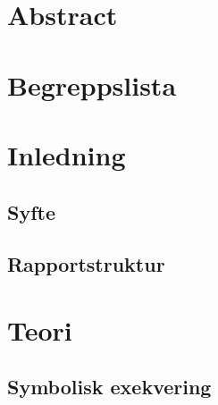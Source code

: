 \documentclass[12pt, a4paper]{report}
\begin{document}


\newpage\null{} %
\newpage


\newpage
{} %
\setcounter{page}{3}

\chapter*{Abstract}

\newpage

\tableofcontents
\newpage

\chapter*{Begreppslista}


\newpage


\chapter{Inledning}\label{chap:inledning}

% 
% 
\section{Syfte}

\section{Rapportstruktur}


\chapter{Teori}\label{chap:teori}

\section{Symbolisk exekvering}\label{sec:symbolic_execution}

\end{document}
